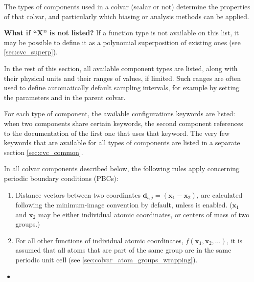The types of components used in a colvar (scalar or not) determine the
properties of that colvar, and particularly which biasing or analysis methods
can be applied.

\textbf{What if ``X'' is not listed?} If a function type is not available on this list, it may be possible to define it as a polynomial superposition of existing ones (see \ref{sec:cvc_superp}).

In the rest of this section, all available component types are listed, along with their physical units and their ranges of values, if limited.
Such ranges are often used to define automatically default sampling intervals, for example by setting the parameters  and  in the parent colvar.

For each type of component, the available configurations keywords are listed:
when two components share certain keywords, the second component references to
the documentation of the first one that uses that keyword.
The very few keywords that are available for all types of components are listed in a separate section \ref{sec:cvc_common}.



In all colvar components described below, the following rules apply concerning periodic boundary
conditions (PBCs):
\begin{enumerate}
\item Distance vectors between two coordinates
  $\mathbf{d}_{i,j} = \left(\mathbf{x}_1 - \mathbf{x}_2\right)$, are calculated following the
  minimum-image convention by default, unless  is enabled.
  ($\mathbf{x}_1$ and $\mathbf{x}_2$ may be either individual atomic coordinates, or centers of mass
  of two groups.)
\item For all other functions of individual atomic coordinates,
  $f\left(\mathbf{x}_1, \mathbf{x}_2, \ldots\right)$, it is assumed that all atoms that are part of
  the same group are in the same periodic unit cell (see \ref{sec:colvar_atom_groups_wrapping}).
\end{enumerate}

\begin{itemize}
\item %
\end{itemize}


